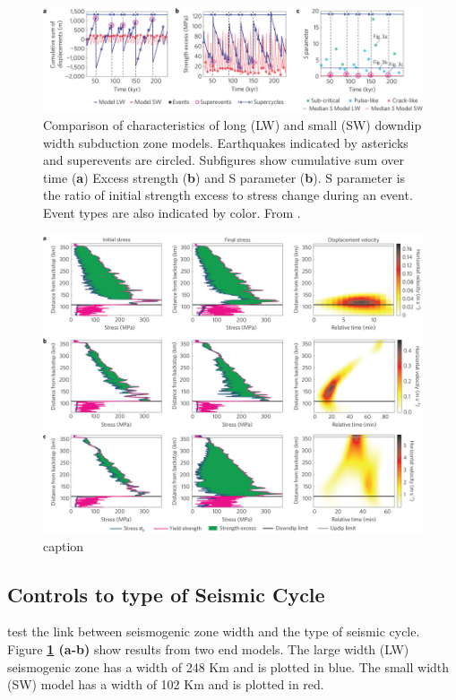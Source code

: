 \documentclass[]{proposalnsf}
\begin{document}
\begin{figure}
	\includegraphics[width=1\linewidth]{Figures/Herrendorfer/ngeo2427-f2.jpeg}
	\caption{Comparison of characteristics of long (LW) and small (SW) downdip width subduction zone models. Earthquakes indicated by astericks and superevents are circled. Subfigures show cumulative sum over time ({\bf a}) Excess strength ({\bf b}) and S parameter ({\bf b}). S parameter is the ratio of initial strength excess to stress change during an event. Event types are also indicated by color. From \citet{Herrendorfer2015}.}
	\label{fig:SZOwidth}
\end{figure}
\begin{figure}
	\includegraphics[width=1\linewidth]{Figures/Herrendorfer/ngeo2427-f3.jpeg}
	\caption{caption}
	\label{fig:ruptureStyle}
\end{figure}

\subsection{Controls to type of Seismic Cycle}
\citet{Herrendorfer2015} test the link between seismogenic zone width and the type of seismic cycle. Figure {\bf \ref{fig:SZOwidth} (a-b)} show results from two end models. The large width (LW) seismogenic zone has a width of 248 Km and is plotted in blue. The small width (SW) model has a width of 102 Km and is plotted in red. 
\end{document}
